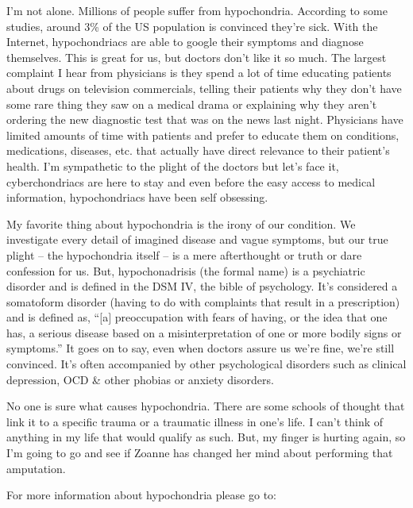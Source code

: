 \documentclass[12pt,a4paper,onecolumn]{article}
\begin{document}
I'm not alone. Millions of people suffer from hypochondria. According to some studies, around 3\% of
the US population is convinced they're sick. With the Internet, hypochondriacs are able to google
their symptoms and diagnose themselves. This is great for us, but doctors don't like it so much. The
largest complaint I hear from physicians is they spend a lot of time educating patients about drugs
on television commercials, telling their patients why they don't have some rare thing they saw on a
medical drama or explaining why they aren't ordering the new diagnostic test that was on the news
last night. Physicians have limited amounts of time with patients and prefer to educate them on
conditions, medications, diseases, etc. that actually have direct relevance to their patient's
health. I'm sympathetic to the plight\cite{plight} of the doctors but let's face it, cyberchondriacs
are here to stay and even before the easy access to medical information, hypochondriacs have been
self obsessing.

My favorite thing about hypochondria is the irony of our condition. We investigate every detail of
imagined disease and vague symptoms, but our true plight -- the hypochondria itself -- is a mere
afterthought or truth or dare confession for us. But, hypochonadrisis (the formal name) is a
psychiatric disorder and is defined in the DSM IV, the bible of psychology. It's considered a
somatoform disorder (having to do with complaints that result in a prescription) and is defined as,
``$[$a$]$ preoccupation with fears of having, or the idea that one has, a serious disease based on a
misinterpretation of one or more bodily signs or symptoms.'' It goes on to say, even when doctors
assure us we're fine, we're still convinced. It's often accompanied by other psychological disorders
such as clinical depression, OCD \& other phobias\cite{phobia} or anxiety disorders.

No one is sure what causes hypochondria. There are some schools of thought that link it to a
specific trauma or a traumatic illness in one's life. I can't think of anything in my life that
would qualify as such. But, my finger is hurting again, so I'm going to go and see if Zoanne has
changed her mind about performing that amputation.

For more information about hypochondria please go to:


\pagebreak




\end{document}
